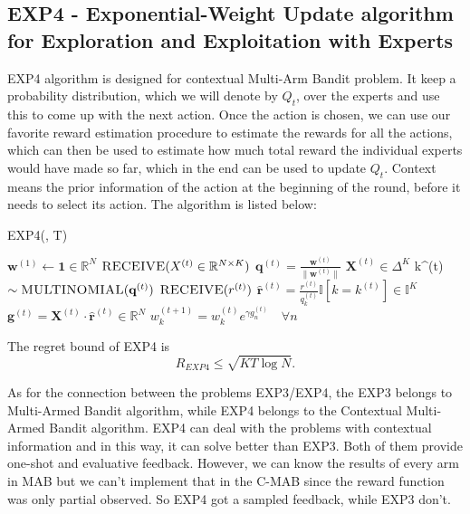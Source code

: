 \documentclass[11pt]{article}
\begin{document}
\subsection{EXP4 - Exponential-Weight Update algorithm for Exploration and Exploitation with  Experts}
EXP4 algorithm is designed for contextual Multi-Arm Bandit problem.
%
It keep a probability distribution, which we will denote by $Q_t$, over the experts and use this to come up with the next action. Once the action is chosen, we can use our favorite reward estimation procedure to estimate the rewards for all the actions, which can then be used to estimate how much total reward the individual experts would have made so far, which in the end can be used to update $Q_t$.
%
Context means the prior information of the action at the beginning of the round, before it needs to select its action.
%
The algorithm is listed below:
\begin{algorithm}[H]
\caption{EXP4(\gamma \in [0, 1], T)}
\label{algo:exp4}
\begin{algorithmic}[1]
\STATE $\textbf{w}^{(1)} \leftarrow \textbf{1} \in \mathbb{R}^N$ \quad {}
\STATE $\textsc{RECEIVE}( X^{(t)}\in \mathbb{R}^{N \times K})$ \quad {}
\STATE $\textbf{q}^{(t)} = \frac{\textbf{w}^{(t)}}{\|\textbf{w}^{(t)}\|}$ \dot $ \textbf{X}^{(t)} \in \Delta^K$ \quad {}
\STATE k^{(t)} $\sim  \textsc{MULTINOMIAL}(\textbf{q}^{(t)})$ \quad {}
\STATE $\textsc{RECEIVE}(r^{(t)})$ \quad {}
\STATE $\hat{\textbf{r}}^{(t)} = \frac{r^{(t)}}{q_k^{(t)}}\mathbb{I}[k = k^{(t)}] \in \mathbb{I}^K$ \quad {}
\STATE $\textbf{g}^{(t)} = \textbf{X}^{(t)} \cdot \hat{\textbf{r}}^{(t)} \in \mathbb{R}^N$ \quad {}
\STATE $w_k^{(t+1)} = w_k^{(t)}e^{\gamma g_n^{(t)}} \quad \forall n$ 
\ENDFOR
\end{algorithmic}
\end{algorithm}
The regret bound of EXP4 is 
$$R_{EXP4} \le \sqrt{KT \log N}.$$

As for the connection between the problems EXP3/EXP4, the EXP3 belongs to Multi-Armed Bandit algorithm, while EXP4 belongs to the Contextual Multi-Armed Bandit algorithm. EXP4 can deal with the problems with contextual information and in this way, it can solve better than EXP3.
%
Both of them provide one-shot and evaluative feedback. However, we can know the results of every arm in MAB but we can't implement that in the C-MAB since the reward function was only partial observed. So EXP4 got a sampled feedback, while EXP3 don't.
\end{document}
